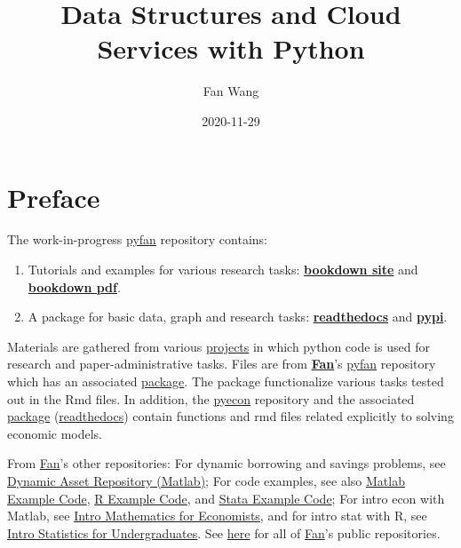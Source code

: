 \documentclass[
]{book}
\title{Data Structures and Cloud Services with Python}
\author{Fan Wang}
\date{2020-11-29}
\providecommand{\tightlist}{%
  \setlength{\itemsep}{0pt}\setlength{\parskip}{0pt}}
\begin{document}
\maketitle

{
\hypersetup{linkcolor=}
\setcounter{tocdepth}{2}
\tableofcontents
}
\hypertarget{preface}{%
\chapter*{Preface}\label{preface}}

The work-in-progress \href{https://github.com/FanWangEcon/pyfan}{pyfan} repository contains:

\begin{enumerate}
\def\labelenumi{\arabic{enumi}.}
\tightlist
\item
  Tutorials and examples for various research tasks: \href{https://fanwangecon.github.io/pyfan/bookdown}{\textbf{bookdown site}} and \href{https://fanwangecon.github.io/pyfan/bookdown/Data-Structures-and-Cloud-Services-with-Python.pdf}{\textbf{bookdown pdf}}.
\item
  A package for basic data, graph and research tasks: \href{https://pyfan.readthedocs.io/en/latest/}{\textbf{readthedocs}} and \href{https://pypi.org/project/pyfan/}{\textbf{pypi}}.
\end{enumerate}

Materials are gathered from various \href{https://fanwangecon.github.io/research}{projects} in which python code is used for research and paper-administrative tasks. Files are from \href{https://fanwangecon.github.io/}{\textbf{Fan}}'s \href{https://github.com/FanWangEcon/pyfan}{pyfan} repository which has an associated \href{https://pypi.org/project/pyfan/}{package}. The package functionalize various tasks tested out in the Rmd files. In addition, the \href{https://github.com/FanWangEcon/pyecon}{pyecon} repository and the associated \href{https://pypi.org/project/pyecon/}{package} (\href{https://pyfan.readthedocs.io/en/latest/autoapi/pyfan/index.html\#module-pyfan}{readthedocs}) contain functions and rmd files related explicitly to solving economic models.

From \href{https://fanwangecon.github.io/}{Fan}'s other repositories: For dynamic borrowing and savings problems, see \href{https://fanwangecon.github.io/CodeDynaAsset/}{Dynamic Asset Repository (Matlab)}; For code examples, see also \href{https://fanwangecon.github.io/M4Econ/}{Matlab Example Code}, \href{https://fanwangecon.github.io/R4Econ/}{R Example Code}, and \href{https://fanwangecon.github.io/Stata4Econ/}{Stata Example Code}; For intro econ with Matlab, see \href{https://fanwangecon.github.io/Math4Econ/}{Intro Mathematics for Economists}, and for intro stat with R, see \href{https://fanwangecon.github.io/Stat4Econ/}{Intro Statistics for Undergraduates}. See \href{https://github.com/FanWangEcon}{here} for all of \href{https://fanwangecon.github.io/}{Fan}'s public repositories.
\end{document}
